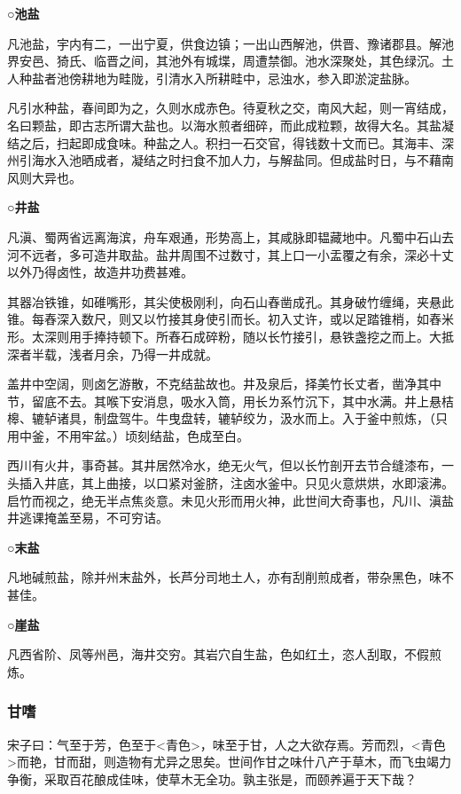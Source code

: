 \documentclass[]{article}
\begin{document}
\textbf{○池盐}

凡池盐，宇内有二，一出宁夏，供食边镇；一出山西解池，供晋、豫诸郡县。解池界安邑、猗氏、临晋之间，其池外有城堞，周遭禁御。池水深聚处，其色绿沉。土人种盐者池傍耕地为畦陇，引清水入所耕畦中，忌浊水，参入即淤淀盐脉。

凡引水种盐，春间即为之，久则水成赤色。待夏秋之交，南风大起，则一宵结成，名曰颗盐，即古志所谓大盐也。以海水煎者细碎，而此成粒颗，故得大名。其盐凝结之后，扫起即成食味。种盐之人。积扫一石交官，得钱数十文而已。其海丰、深州引海水入池晒成者，凝结之时扫食不加人力，与解盐同。但成盐时日，与不藉南风则大异也。

\textbf{○井盐}

凡滇、蜀两省远离海滨，舟车艰通，形势高上，其咸脉即韫藏地中。凡蜀中石山去河不远者，多可造井取盐。盐井周围不过数寸，其上口一小盂覆之有余，深必十丈以外乃得卤性，故造井功费甚难。

其器冶铁锥，如碓嘴形，其尖使极刚利，向石山舂凿成孔。其身破竹缠绳，夹悬此锥。每舂深入数尺，则又以竹接其身使引而长。初入丈许，或以足踏锥梢，如舂米形。太深则用手捧持顿下。所舂石成碎粉，随以长竹接引，悬铁盏挖之而上。大抵深者半载，浅者月余，乃得一井成就。

盖井中空阔，则卤乞游散，不克结盐故也。井及泉后，择美竹长丈者，凿净其中节，留底不去。其喉下安消息，吸水入筒，用长ㄌ系竹沉下，其中水满。井上悬桔槔、辘轳诸具，制盘驾牛。牛曳盘转，辘轳绞ㄌ，汲水而上。入于釜中煎炼，（只用中釜，不用牢盆。）顷刻结盐，色成至白。

西川有火井，事奇甚。其井居然冷水，绝无火气，但以长竹剖开去节合缝漆布，一头插入井底，其上曲接，以口紧对釜脐，注卤水釜中。只见火意烘烘，水即滚沸。启竹而视之，绝无半点焦炎意。未见火形而用火神，此世间大奇事也，凡川、滇盐井逃课掩盖至易，不可穷诘。

\textbf{○末盐}

凡地碱煎盐，除并州末盐外，长芦分司地土人，亦有刮削煎成者，带杂黑色，味不甚佳。

\textbf{○崖盐}

凡西省阶、凤等州邑，海井交穷。其岩穴自生盐，色如红土，恣人刮取，不假煎炼。

\hypertarget{header-n2420}{%
\subsubsection{甘嗜}\label{header-n2420}}

宋子曰：气至于芳，色至于\textless{}青色\textgreater{}，味至于甘，人之大欲存焉。芳而烈，\textless{}青色\textgreater{}而艳，甘而甜，则造物有尤异之思矣。世间作甘之味什八产于草木，而飞虫竭力争衡，采取百花酿成佳味，使草木无全功。孰主张是，而颐养遍于天下哉？
\end{document}
